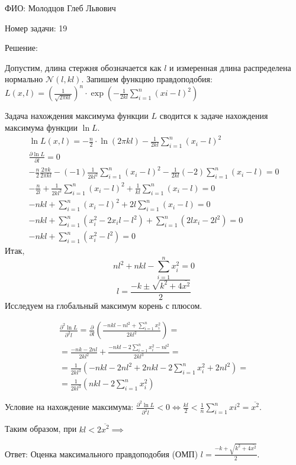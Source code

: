 \documentclass[14pt]{extarticle}
\begin{document}
ФИО: Молодцов Глеб Львович

\vspace{10pt}

Номер задачи: 19

\vspace{10pt}

Решение:

\vspace{10pt}

Допустим, длина стержня обозначается как $l$ и измеренная длина распределена нормально $\mathcal{N}(l, kl)$. Запишем функцию правдоподобия:\\ 
$ L(x, l) = \left(\frac{1}{\sqrt{2\pi kl}}\right)^n\cdot \exp \left(-\frac{1}{2kl}\sum\limits_{i=1}^n (xi - l)^2\right) $

Задача нахождения максимума функции $L$ сводится к задаче нахождения максимума функции $\ln L$. 
\begin{gather*}
    \ln L(x, l) = -\frac{n}{2}\cdot\ln(2\pi kl)-\frac{1}{2kl}\sum\limits_{i=1}^n (x_i - l)^2
    \\
    \frac{\partial \ln L}{\partial l} = 0
    \\
    -\frac{n}{2}\frac{2\pi k}{2\pi kl} - (-1)\frac{1}{2kl^2}\sum\limits_{i=1}^n (x_i - l)^2 - \frac{1}{2kl}(-2)\sum\limits_{i=1}^n (x_i - l) = 0
    \\
    -\frac{n}{2l}+\frac{1}{2kl^2}\sum\limits_{i=1}^n (x_i - l)^2 + \frac{1}{kl}\sum\limits_{i=1}^n (x_i - l) = 0
    \\
    -nkl + \sum\limits_{i=1}^n (x_i - l)^2 + 2l\sum\limits_{i=1}^n (x_i - l) = 0
    \\
    -nkl + \sum\limits_{i=1}^n (x_i^2 - 2x_i l - l^2) + \sum\limits_{i=1}^n (2lx_i - 2l^2) = 0
    \\
    -nkl + \sum\limits_{i=1}^n (x_i^2 - l^2) = 0 
\end{gather*}
Итак,
    $$nl^2 + nkl - \sum\limits_{i=1}^n x_i^2 = 0 $$
    $$l = \frac{-k \pm \sqrt{k^2 + 4\overline{x^2}}}{2}$$
Исследуем на глобальный максимум корень с плюсом.

\begin{gather}
    \frac{\partial^2 \ln L}{\partial^2 l} = \frac{\partial}{\partial l}\left(\frac{-nkl - nl^2 + \sum\limits_{i=1}^n x_i^2}{2kl^2}\right) = 
    \\
    = \frac{-nk - 2nl}{2kl^2} + \frac{-nkl - 2 \sum\limits_{i=1}^n x_i^2 - nl^2}{2kl^3} =
    \\
    = \frac{1}{2kl^3}\left(-nkl - 2nl^2 + 2nkl - 2\sum\limits_{i=1}^n x_i^2 + 2nl^2\right) =\\
    =\frac{1}{2kl^3}\left(nkl - 2\sum\limits_{i=1}^n x_i^2\right)
\end{gather}

Условие на нахождение максимума:
$\frac{\partial^2 \ln L}{\partial^2 l} < 0 \Leftrightarrow \frac{kl}{2} < \frac{1}{n}\sum\limits_{i=1}^n xi^2 = \overline{x^2}.$

Таким образом, при  $kl < 2\overline{x^2} \implies$ 

\vspace{10pt}

Ответ: 
Оценка максимального правдоподобия (ОМП) $l = \frac{-k + \sqrt{k^2 + 4\overline{x^2}}}{2}.$
\end{document}
